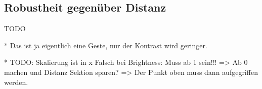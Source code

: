 \subsection{Robustheit gegenüber Distanz}
TODO

* Das ist ja eigentlich eine Geste, nur der Kontrast wird geringer.

* TODO: Skalierung ist in x Falsch bei Brightness: Muss ab 1 sein!!!
    => Ab 0 machen und Distanz Sektion sparen?
    => Der Punkt oben muss dann aufgegriffen werden.
